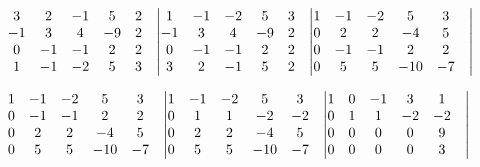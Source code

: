 \documentclass[../szamtud.tex]{subfiles}
\begin{document}
        $ 
            \begin{matrix}
                3 & 2 & -1 & 5 & 2 & \bigm| \\
                -1 & 3 & 4 & -9 & 2 & \bigm| \\
                0 & -1 & -1 & 2 & 2 & \bigm| \\
                1 & -1 & -2 & 5 & 3 & \bigm| 
            \end{matrix}  
            \begin{matrix}
                1 & -1 & -2 & 5 & 3 & \bigm| \\
                -1 & 3 & 4 & -9 & 2 & \bigm| \\
                0 & -1 & -1 & 2 & 2 & \bigm| \\
                3 & 2 & -1 & 5 & 2 & \bigm| 
            \end{matrix} 
            \begin{matrix}
                1 & -1 & -2 & 5 & 3 & \bigm| \\
                0 & 2 & 2 & -4 & 5 & \bigm| \\
                0 & -1 & -1 & 2 & 2 & \bigm| \\
                0 & 5 & 5 & -10 & -7 & \bigm| 
            \end{matrix} 
        $

        $
            \begin{matrix}
                1 & -1 & -2 & 5 & 3 & \bigm| \\
                0 & -1 & -1 & 2 & 2 & \bigm| \\
                0 & 2 & 2 & -4 & 5 & \bigm| \\
                0 & 5 & 5 & -10 & -7 & \bigm| 
            \end{matrix} 
            \begin{matrix}
                1 & -1 & -2 & 5 & 3 & \bigm| \\
                0 & 1 & 1 & -2 & -2 & \bigm| \\
                0 & 2 & 2 & -4 & 5 & \bigm| \\
                0 & 5 & 5 & -10 & -7 & \bigm| 
            \end{matrix} 
            \begin{matrix}
                1 & 0 & -1 & 3 & 1 & \bigm| \\
                0 & 1 & 1 & -2 & -2 & \bigm| \\
                0 & 0 & 0 & 0 & 9 & \bigm| \\
                0 & 0 & 0 & 0 & 3 & \bigm| 
            \end{matrix} 
        $
\end{document}
